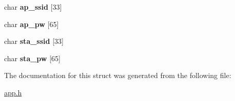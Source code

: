 \begin{DoxyCompactItemize}
\item 
char {\bfseries ap\+\_\+ssid} \mbox{[}33\mbox{]}\hypertarget{structapp__data__t_a6ce126ae06ee2fdb5a9d222caf5c1414}{}\label{structapp__data__t_a6ce126ae06ee2fdb5a9d222caf5c1414}

\item 
char {\bfseries ap\+\_\+pw} \mbox{[}65\mbox{]}\hypertarget{structapp__data__t_a9857021df207c4c1354d7fb444ea4f0a}{}\label{structapp__data__t_a9857021df207c4c1354d7fb444ea4f0a}

\item 
char {\bfseries sta\+\_\+ssid} \mbox{[}33\mbox{]}\hypertarget{structapp__data__t_a218d0dba49c33804c23f1b752e394c23}{}\label{structapp__data__t_a218d0dba49c33804c23f1b752e394c23}

\item 
char {\bfseries sta\+\_\+pw} \mbox{[}65\mbox{]}\hypertarget{structapp__data__t_affa693b5a2296924fd442f074128049e}{}\label{structapp__data__t_affa693b5a2296924fd442f074128049e}

\end{DoxyCompactItemize}


The documentation for this struct was generated from the following file\+:\begin{DoxyCompactItemize}
\item 
\hyperlink{app_8h}{app.\+h}\end{DoxyCompactItemize}
